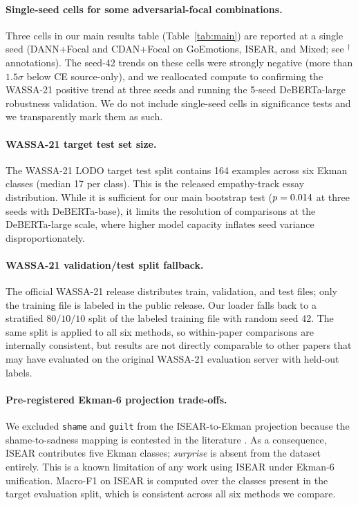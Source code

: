 
\paragraph{Single-seed cells for some adversarial-focal combinations.}
Three cells in our main results table (Table~\ref{tab:main}) are
reported at a single seed (DANN+Focal and CDAN+Focal on GoEmotions,
ISEAR, and Mixed; see $^\dagger$ annotations). The seed-42 trends on
these cells were strongly negative (more than $1.5\sigma$ below CE
source-only), and we reallocated compute to confirming the WASSA-21
positive trend at three seeds and running the 5-seed DeBERTa-large
robustness validation. We do not include single-seed cells in
significance tests and we transparently mark them as such.

\paragraph{WASSA-21 target test set size.}
The WASSA-21 LODO target test split contains 164 examples across
six Ekman classes (median 17 per class). This is the released
empathy-track essay distribution. While it is sufficient for our
main bootstrap test ($p = 0.014$ at three seeds with
DeBERTa-base), it limits the resolution of comparisons at the
DeBERTa-large scale, where higher model capacity inflates seed
variance disproportionately.

\paragraph{WASSA-21 validation/test split fallback.}
The official WASSA-21 release distributes train, validation, and test
files; only the training file is labeled in the public release. Our
loader falls back to a stratified $80/10/10$ split of the labeled
training file with random seed 42. The same split is applied to all
six methods, so within-paper comparisons are internally consistent,
but results are not directly comparable to other papers that may
have evaluated on the original WASSA-21 evaluation server with held-out
labels.

\paragraph{Pre-registered Ekman-6 projection trade-offs.}
We excluded \texttt{shame} and \texttt{guilt} from the ISEAR-to-Ekman
projection because the shame-to-sadness mapping is contested in the
literature \citep{bostan2018analysis}. As a consequence, ISEAR
contributes five Ekman classes; \emph{surprise} is absent from the
dataset entirely. This is a known limitation of any work using ISEAR
under Ekman-6 unification. Macro-F1 on ISEAR is computed over the
classes present in the target evaluation split, which is consistent
across all six methods we compare.

